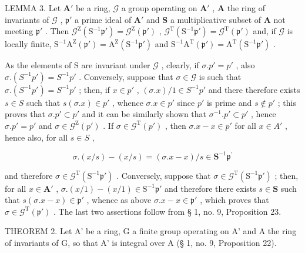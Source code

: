 LEMMA 3. Let \(\mathbf{A}'\) be a ring, \(\mathcal{G}\) a group operating on \(\mathbf{A}'\) , \(\mathbf{A}\) the ring of invariants of \(\mathcal{G}\) , \(\mathfrak{p}'\) a prime ideal of \(\mathbf{A}'\) and \(\mathbf{S}\) a multiplicative subset of \(\mathbf{A}\) not meeting \(\mathfrak{p}'\) . Then \(\mathcal{G}^{\mathrm{Z}}(\mathrm{S}^{-1}\mathfrak{p}') = \mathcal{G}^{\mathrm{Z}}(\mathfrak{p}')\) , \(\mathcal{G}^{\mathrm{T}}(\mathrm{S}^{-1}\mathfrak{p}') = \mathcal{G}^{\mathrm{T}}(\mathfrak{p}')\) and, if \(\mathcal{G}\) is locally finite, \(\mathrm{S}^{-1}\mathrm{A}^{\mathrm{Z}}(\mathfrak{p}') = \mathrm{A}^{\mathrm{Z}}(\mathrm{S}^{-1}\mathfrak{p}')\) and \(\mathrm{S}^{-1}\mathrm{A}^{\mathrm{T}}(\mathfrak{p}') = \mathrm{A}^{\mathrm{T}}(\mathrm{S}^{-1}\mathfrak{p}')\) .

As the elements of S are invariant under \(\mathcal{G}\) , clearly, if \(\sigma. p' = p'\) , also \(\sigma. (S^{-1}p') = S^{-1}p'\) . Conversely, suppose that \(\sigma \in \mathcal{G}\) is such that \(\sigma. (S^{-1}p') = S^{-1}p'\) ; then, if \(x \in p'\) , \((\sigma.x)/1 \in S^{-1}p'\) and there therefore exists \(s \in S\) such that \(s(\sigma.x) \in p'\) , whence \(\sigma.x \in p'\) since \(p'\) is prime and \(s \notin p'\) ; this proves that \(\sigma. p' \subset p'\) and it can be similarly shown that \(\sigma^{-1}. p' \subset p'\) , hence \(\sigma. p' = p'\) and \(\sigma \in \mathcal{G}^{\mathrm{Z}}(p')\) . If \(\sigma \in \mathcal{G}^{\mathrm{T}}(p')\) , then \(\sigma.x - x \in p'\) for all \(x \in A'\) , hence also, for all \(s \in S\) ,

\[
\sigma . (x / s) - (x / s) = (\sigma . x - x) / s \in \mathbf {S} ^ {- 1} \mathfrak {p} ^ {\prime}
\]

and therefore \(\sigma \in \mathcal{G}^{\mathrm{T}}(\mathrm{S}^{-1}\mathfrak{p}')\) . Conversely, suppose that \(\sigma \in \mathcal{G}^{\mathrm{T}}(\mathrm{S}^{-1}\mathfrak{p}')\) ; then, for all \(x \in \mathbf{A}'\) , \(\sigma.(x/1) - (x/1) \in \mathrm{S}^{-1}\mathfrak{p}'\) and therefore there exists \(s \in \mathbf{S}\) such that \(s(\sigma.x - x) \in \mathfrak{p}'\) , whence as above \(\sigma.x - x \in \mathfrak{p}'\) , which proves that \(\sigma \in \mathcal{G}^{\mathrm{T}}(\mathfrak{p}')\) . The last two assertions follow from § 1, no. 9, Proposition 23.

THEOREM 2. Let A' be a ring, G a finite group operating on A' and A the ring of invariants of G, so that A' is integral over A (§ 1, no. 9, Proposition 22).

